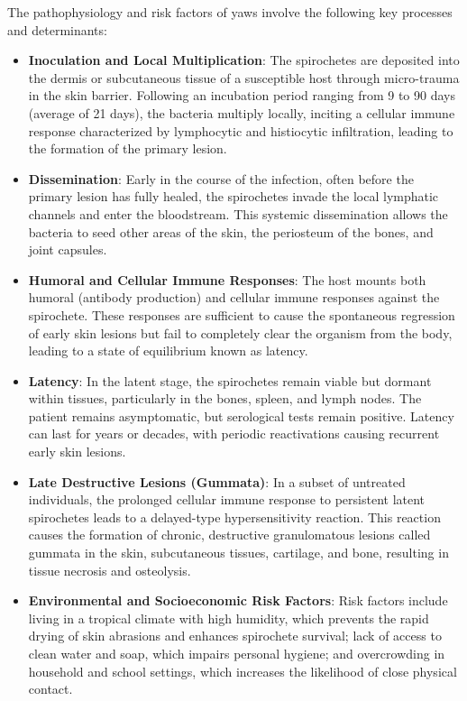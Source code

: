 The pathophysiology and risk factors of yaws involve the following key processes and determinants:
\begin{itemize}
    \item \textbf{Inoculation and Local Multiplication}: The spirochetes are deposited into the dermis or subcutaneous tissue of a susceptible host through micro-trauma in the skin barrier. Following an incubation period ranging from 9 to 90 days (average of 21 days), the bacteria multiply locally, inciting a cellular immune response characterized by lymphocytic and histiocytic infiltration, leading to the formation of the primary lesion.
    \item \textbf{Dissemination}: Early in the course of the infection, often before the primary lesion has fully healed, the spirochetes invade the local lymphatic channels and enter the bloodstream. This systemic dissemination allows the bacteria to seed other areas of the skin, the periosteum of the bones, and joint capsules.
    \item \textbf{Humoral and Cellular Immune Responses}: The host mounts both humoral (antibody production) and cellular immune responses against the spirochete. These responses are sufficient to cause the spontaneous regression of early skin lesions but fail to completely clear the organism from the body, leading to a state of equilibrium known as latency.
    \item \textbf{Latency}: In the latent stage, the spirochetes remain viable but dormant within tissues, particularly in the bones, spleen, and lymph nodes. The patient remains asymptomatic, but serological tests remain positive. Latency can last for years or decades, with periodic reactivations causing recurrent early skin lesions.
    \item \textbf{Late Destructive Lesions (Gummata)}: In a subset of untreated individuals, the prolonged cellular immune response to persistent latent spirochetes leads to a delayed-type hypersensitivity reaction. This reaction causes the formation of chronic, destructive granulomatous lesions called gummata in the skin, subcutaneous tissues, cartilage, and bone, resulting in tissue necrosis and osteolysis.
    \item \textbf{Environmental and Socioeconomic Risk Factors}: Risk factors include living in a tropical climate with high humidity, which prevents the rapid drying of skin abrasions and enhances spirochete survival; lack of access to clean water and soap, which impairs personal hygiene; and overcrowding in household and school settings, which increases the likelihood of close physical contact.
\end{itemize}

